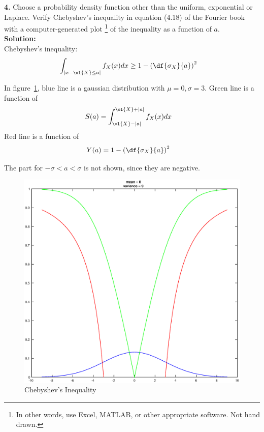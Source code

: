 \textbf{4.} Choose a probability density function other than the uniform, exponential or Laplace. 
Verify Chebyshev's inequality in equation (4.18) of the Fourier book with a computer-generated plot
\footnote{In other words, use Excel, MATLAB, or other appropriate software. Not hand drawn.}
of the inequality as a function of $a$. \\
\textbf{Solution:} \\
Chebyshev's inequality:
\begin{align*}
  \int_{\left| x - \ol{X}\leq a\right|}f_X(x)dx & \geq 1 - \left( \df{\sigma_X}{a} \right)^2
\end{align*}

In figure~\ref{fig:cheby}, blue line is a gaussian distribution with $\mu = 0, \sigma = 3$. 
Green line is a function of
\begin{align*}
  S(a) & = \int_{\ol{X} - |a|}^{\ol{X} + |a|}f_X(x)dx
\end{align*}
Red line is a function of
\begin{align*}
  Y(a) & = 1 - \left( \df{\sigma_X}{a} \right)^2
\end{align*}

The part for $-\sigma < a < \sigma$ is not shown, since they are negative.

\begin{figure}[h!]
  \begin{center}
    \includegraphics[width=6in]{chebyshev_inequality.eps}
  \end{center}
  \caption{Chebyshev's Inequality}
  \label{fig:cheby}
\end{figure}

\vspace{.5in}
